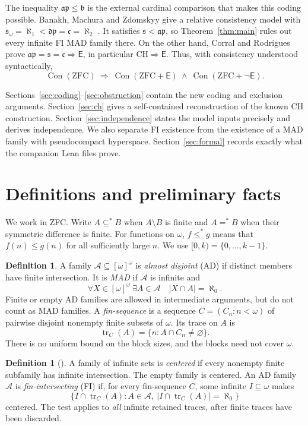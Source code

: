 \documentclass[11pt,letterpaper]{article}
\theoremstyle{definition}
\newtheorem{definition}[theorem]{Definition}
\theoremstyle{remark}
\newcommand{\s}{\mathfrak{s}}
\newcommand{\bnum}{\mathfrak{b}}
\newcommand{\ap}{\mathfrak{ap}}
\newcommand{\dpnum}{\mathfrak{dp}}
\newcommand{\cont}{\mathfrak{c}}
\newcommand{\A}{\mathcal{A}}
\newcommand{\Con}{\operatorname{Con}}
\newcommand{\tr}{\operatorname{tr}}
\newcommand{\E}{\mathsf{E}}
\begin{document}
The inequality $\ap\leq\bnum$ is the external cardinal comparison that makes
this coding possible. Banakh, Machura and Zdomskyy give a relative
consistency model with $\s_\omega=\aleph_1<\dpnum=\cont=\aleph_2$ \cite{BMZ}.
It satisfies $\s<\ap$, so Theorem~\ref{thm:main} rules out every infinite
FI MAD family there. On the other hand, Corral and Rodrigues prove
$\ap=\s=\cont\Rightarrow\E$, in particular $\mathrm{CH}\Rightarrow\E$.
Thus, with consistency understood syntactically,
\[
 \Con(\mathrm{ZFC})\ \Longrightarrow\
 \Con(\mathrm{ZFC}+\E)\ \wedge\ \Con(\mathrm{ZFC}+\neg\E).
\]

Sections~\ref{sec:coding}--\ref{sec:obstruction} contain the new coding and
exclusion arguments. Section~\ref{sec:ch} gives a self-contained reconstruction
of the known CH construction. Section~\ref{sec:independence} states the model
inputs precisely and derives independence. We also separate FI existence
from the existence of a MAD family with pseudocompact hyperspace.
Section~\ref{sec:formal} records exactly what the companion Lean files prove.

\section{Definitions and preliminary facts}
We work in ZFC. Write $A\subseteq^*B$ when $A\setminus B$ is finite and
$A=^*B$ when their symmetric difference is finite. For functions on $\omega$,
$f\leq^*g$ means that $f(n)\leq g(n)$ for all sufficiently large $n$.
We use $[0,k)=\{0,\ldots,k-1\}$.

\begin{definition}
A family $\A\subseteq[\omega]^\omega$ is \emph{almost disjoint} (AD) if distinct
members have finite intersection. It is \emph{MAD} if $\A$ is infinite and
\[
 \forall X\in[\omega]^\omega\ \exists A\in\A\quad |X\cap A|=\aleph_0.
\]
Finite or empty AD families are allowed in intermediate arguments, but do
not count as MAD families.
A \emph{fin-sequence} is a sequence $C=(C_n:n<\omega)$ of pairwise disjoint
nonempty finite subsets of $\omega$. Its trace on $A$ is
\[
 \tr_C(A)=\{n:A\cap C_n\ne\varnothing\}.
\]
There is no uniform bound on the block sizes, and the blocks need not
cover $\omega$.
\end{definition}

\begin{definition}[{\cite[Definition~2.3]{CR}}]
A family of infinite sets is \emph{centered} if every nonempty finite
subfamily has infinite intersection. The empty family is centered.
An AD family $\A$ is \emph{fin-intersecting} (FI) if, for every fin-sequence
$C$, some infinite $I\subseteq\omega$ makes
\[
 \{I\cap\tr_C(A):A\in\A,\ |I\cap\tr_C(A)|=\aleph_0\}
\]
centered. The test applies to \emph{all} infinite retained traces, after
finite traces have been discarded.
\end{definition}
\end{document}
